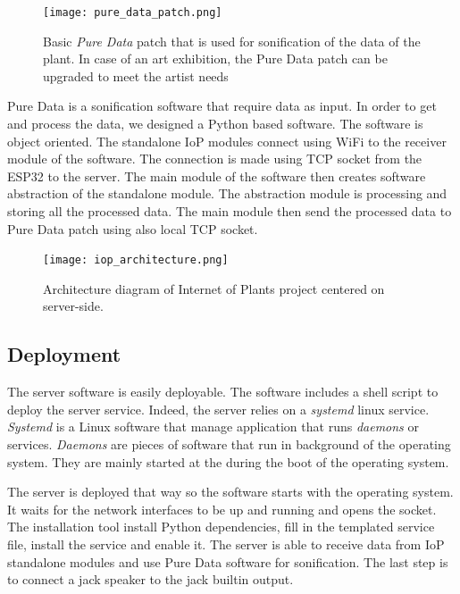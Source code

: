 \begin{figure}[h]
    \centering
    \texttt{[image: pure\_data\_patch.png]}
    \caption{Basic \textit{Pure Data} patch that is used for sonification of the data
    of the plant. In case of an art exhibition, the Pure Data patch can be upgraded to meet the
    artist needs} 
    \vspace{0.1cm}
    \label{fig:pure_data_patch}
\end{figure}


Pure Data is a sonification software that require data as input. In order to get and process the data,
we designed a Python based software. %
The software is object oriented. The standalone IoP modules connect using WiFi to the receiver module
of the software. The connection is made using TCP socket from the ESP32 to the server.
The main module of the software then creates software abstraction of the standalone module. 
The abstraction module is processing and storing all the processed data.
The main module then send the processed data to Pure Data patch using also local TCP socket.

\begin{figure}[h]
    \centering
    \texttt{[image: iop\_architecture.png]}
    \caption{Architecture diagram of Internet of Plants project centered on server-side.} 
    \vspace{0.1cm}
    \label{fig:server_architecture}
\end{figure}


\subsection{Deployment} %

The server software is easily deployable. The software includes a shell script to deploy the server service.
Indeed, the server relies on a \textit{systemd} linux service. \textit{Systemd} \cite{Both2020} is a
Linux software that manage application that runs \textit{daemons} or services.
\textit{Daemons} are pieces of software that run in background of the operating
system. They are mainly started at the during the boot of the operating system.

The server is deployed that way so the software starts with the operating system.
It waits for the network interfaces to be up and running and opens the socket.
The installation tool install Python dependencies, fill in the templated service file,
install the service and enable it. The server is able to receive data from IoP standalone
modules and use Pure Data software for sonification. The last step is to connect
a jack speaker to the jack builtin output.

